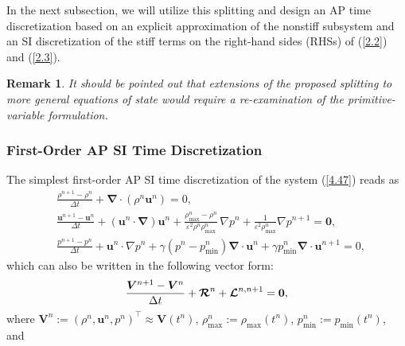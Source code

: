 \documentclass[A4paper,12pt,twoside]{article}
\newtheorem{remark}{Remark}[section]
\numberwithin{equation}{section}
\numberwithin{figure}{section}
\numberwithin{table}{section}
\def\bnabla{\bm{\nabla}}
\newcommand{\dt}{\Delta t}
\newcommand{\ve}{\varepsilon}
\newcommand\eref[1]{(\ref{#1})}
\begin{document}
In the next subsection, we will utilize this splitting and design an AP time discretization based on an explicit approximation of the
nonstiff subsystem and an SI discretization of the stiff terms on the right-hand sides (RHSs) of \eref{2.2} and \eref{2.3}.
{\color{black}
\begin{remark}
It should be pointed out that extensions of the proposed splitting to more general equations of state would require a re-examination of the
primitive-variable formulation.
\end{remark}}

\subsubsection{First-Order AP SI Time Discretization}
The simplest first-order AP SI time discretization of the system \eref{4.47} reads as
\begin{equation}
\begin{aligned}
&\frac{\rho^{n+1}-\rho^n}{\dt}+\bnabla\!\cdot\!(\rho^n\bm u^n)=0,\\
&\frac{\bm u^{n+1}-\bm u^n}{\dt}+(\bm u^n\!\cdot\!\bnabla)\bm u^n+\frac{\rho_{\max}^n-\rho^n}{\ve^2\rho^n\rho_{\max}^n}\,\nabla p^n+
\frac{1}{\ve^2\rho_{\max}^n}\nabla p^{n+1}=\bm0,\\
&\frac{p^{n+1}-p^n}{\dt}+\bm u^n\!\cdot\!\nabla p^n+\gamma(p^n-p_{\min}^n)\bnabla\!\cdot\!\bm u^n+\gamma p_{\min}^n
\bnabla\!\cdot\!\bm u^{n+1}=0,
\end{aligned}
\label{4.8}
\end{equation}
which can also be written in the following vector form:
\begin{equation*}
\frac{\bm V^{n+1}-\bm V^n}{\dt}+\bm{{\cal R}}^n+\bm{{\cal L}}^{n,n+1}=\bm0,
\end{equation*}
where $\bm V^n:=(\rho^n,\bm u^n,p^n)^\top\approx\bm V(t^n)$, $\rho_{\max}^n:=\rho_{\max}(t^n)$, $p_{\min}^n:=p_{\min}(t^n)$, and 
\end{document}
